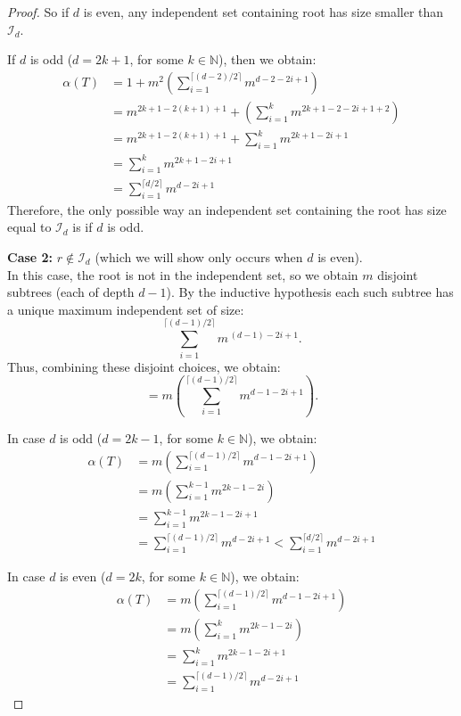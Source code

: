 \documentclass{amsart}
\theoremstyle{definition}
\newcommand\II{{\mathcal I}}
\begin{document}
\begin{proof}
	So if $d$ is even, any independent set containing root has size smaller than $\II_d$.
	\newline

        If $d$ is odd ($d = 2k + 1$, for some $k \in \mathbb{N}$), then we obtain:
	\begin{align*}
		\alpha(T) & = 1 + m^2\left(\sum_{i=1}^{\lceil (d-2)/2 \rceil} m^{d - 2 -2i+1}\right) \\
		& = m^{2k + 1 - 2(k + 1) + 1} + \left(\sum_{i = 1}^{k} m^{2k + 1 - 2 - 2i + 1 + 2}\right) \\
		& = m^{2k + 1 - 2(k + 1) + 1} + \sum_{i = 1}^{k} m^{2k + 1 - 2i + 1} \\
		& = \sum_{i = 1}^{k} m^{2k + 1 - 2i + 1} \\
		& = \sum_{i = 1}^{\lceil d/2 \rceil}m^{d-2i+1}
	\end{align*}
        Therefore, the only possible way an independent set containing the root has size equal to $\II_d$ is if $d$ is odd.

	\medskip

	\textbf{Case 2:} $r\notin \mathcal{I}_{d}$ (which we will show only occurs when $d$ is even).\\[1mm]
	In this case, the root is not in the independent set, so we obtain $m$ disjoint subtrees (each of depth $d-1$). By the inductive hypothesis each such subtree has a unique maximum independent set of size:
	\[
		\sum_{i=1}^{\lceil (d-1)/2 \rceil} m^{\, (d-1)-2i+1}.
	\]
	Thus, combining these disjoint choices, we obtain:
	\[
		= m\left(\sum_{i=1}^{\lceil (d-1)/2 \rceil} m^{d-1-2i+1}\right).
	\]

	In case $d$ is odd ($d = 2k - 1$, for some $k \in \mathbb{N}$), we obtain:
	\begin{align*}
		\alpha(T) & = m\left(\sum_{i=1}^{\lceil (d-1)/2 \rceil} m^{d - 1 -2i+1}\right) \\
		& = m\left(\sum_{i=1}^{k - 1} m^{2k - 1 - 2i}\right) \\
		& = \sum_{i=1}^{k - 1} m^{2k - 1 - 2i + 1}  \\
		& = \sum_{i = 1}^{\lceil (d - 1)/ 2\rceil}m^{d-2i+1} 
		< \sum_{i = 1}^{\lceil d/2 \rceil}m^{d - 2i + 1} 
	\end{align*}

	In case $d$ is even ($d = 2k$, for some $k \in \mathbb{N}$), we obtain:
	\begin{align*}
		\alpha(T) & = m\left(\sum_{i=1}^{\lceil (d-1)/2 \rceil} m^{d - 1 -2i+1}\right) \\
			  & = m\left(\sum_{i=1}^{k} m^{2k - 1 - 2i}\right) \\
			  & = \sum_{i=1}^{k} m^{2k - 1 - 2i + 1} \\
			  & = \sum_{i = 1}^{\lceil (d - 1)/ 2\rceil}m^{d-2i+1}
	\end{align*}


\end{proof}
\end{document}
